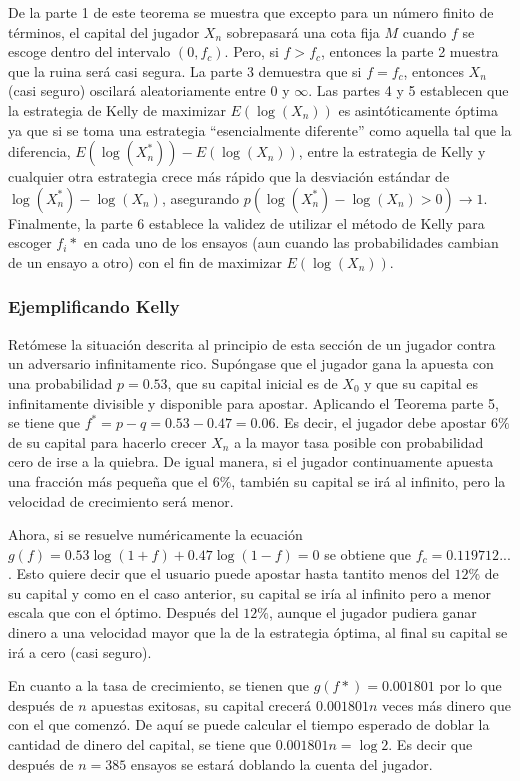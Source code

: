 De la parte 1 de este teorema se muestra que excepto para un número finito de términos, el capital del jugador $X_n$ sobrepasará una cota fija $M$ cuando $f$ se escoge dentro del intervalo $(0,f_c)$. Pero, si $f>f_c$, entonces la parte 2 muestra que la ruina será casi segura. La parte 3 demuestra que si $f=f_c$, entonces $X_n$ (casi seguro) oscilará aleatoriamente entre $0$ y $\infty$. Las partes 4 y 5 establecen que la estrategia de Kelly de maximizar $E(\log(X_n))$ es asintóticamente óptima ya que si se toma una estrategia ``esencialmente diferente'' como aquella tal que la diferencia, $E(\log(X_n^*)) - E(\log(X_n))$, entre la estrategia de Kelly y cualquier otra estrategia crece más rápido que la desviación estándar de $\log(X_n^*) - \log(X_n)$, asegurando $p(\log(X_n^*)-\log(X_n)>0) \to 1$. Finalmente, la parte 6 establece la validez de utilizar el método de Kelly para escoger $f_i*$ en cada uno de los ensayos (aun cuando las probabilidades cambian de un ensayo a otro) con el fin de maximizar $E(\log(X_n))$.

\subsubsection{Ejemplificando Kelly} %
Retómese la situación descrita al principio de esta sección de un jugador contra un adversario infinitamente rico. Supóngase que el jugador gana la apuesta con una probabilidad $p=0.53$, que su capital inicial es de $X_0$ y que su capital es infinitamente divisible y disponible para apostar. Aplicando el Teorema parte 5, se tiene que $f^* = p-q =0.53-0.47 = 0.06$. Es decir, el jugador debe apostar $6\%$ de su capital para hacerlo crecer $X_n$ a la mayor tasa posible con probabilidad cero de irse a la quiebra. De igual manera, si el jugador continuamente apuesta una fracción más pequeña que el $6\%$, también su capital se irá al infinito, pero la velocidad de crecimiento será menor.

Ahora, si se resuelve numéricamente la ecuación $g(f) = 0.53\log(1+f)+0.47\log(1-f)=0$ se obtiene que $f_c= 0.119712...$. Esto quiere decir que el usuario puede apostar hasta tantito menos del $12\%$ de su capital y como en el caso anterior, su capital se iría al infinito pero a menor escala que con el óptimo. Después del $12\%$, aunque el jugador pudiera ganar dinero a una velocidad mayor que la de la estrategia óptima, al final su capital se irá a cero (casi seguro). 

En cuanto a la tasa de crecimiento, se tienen que $g(f*)= 0.001801$ por lo que después de $n$ apuestas exitosas, su capital crecerá $0.001801n$ veces más dinero que con el que comenzó. De aquí se puede calcular el tiempo esperado de doblar la cantidad de dinero del capital, se tiene que $0.001801n=\log2$. Es decir que después de $n=385$ ensayos se estará doblando la cuenta del jugador.

